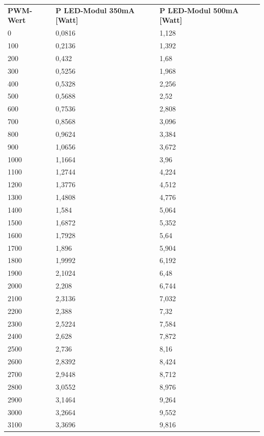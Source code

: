 \documentclass[a4paper,12pt]{scrartcl}
\begin{document}
\begin{longtable}[H]{p{35mm}>{\columncolor[gray]{0.97}}p{35mm}p{35mm}}
  \rowcolor[gray]{.9}
    \textbf{PWM-Wert} & \textbf{P LED-Modul 350mA [Watt]} & \textbf{P LED-Modul 500mA [Watt]} \\ 
0	&	0,0816	&	1,128	\\
\rowcolor[gray]{.95}
100	&	0,2136	&	1,392	\\
200	&	0,432	&	1,68	\\
\rowcolor[gray]{.95}
300	&	0,5256	&	1,968	\\
400	&	0,5328	&	2,256	\\
\rowcolor[gray]{.95}
500	&	0,5688	&	2,52	\\
600	&	0,7536	&	2,808	\\
\rowcolor[gray]{.95}
700	&	0,8568	&	3,096	\\
800	&	0,9624	&	3,384	\\
\rowcolor[gray]{.95}
900	&	1,0656	&	3,672	\\
1000	&	1,1664	&	3,96	\\
\rowcolor[gray]{.95}
1100	&	1,2744	&	4,224	\\
1200	&	1,3776	&	4,512	\\
\rowcolor[gray]{.95}
1300	&	1,4808	&	4,776	\\
1400	&	1,584	&	5,064	\\
\rowcolor[gray]{.95}
1500	&	1,6872	&	5,352	\\
1600	&	1,7928	&	5,64	\\
\rowcolor[gray]{.95}
1700	&	1,896	&	5,904	\\
1800	&	1,9992	&	6,192	\\
\rowcolor[gray]{.95}
1900	&	2,1024	&	6,48	\\
2000	&	2,208	&	6,744	\\
\rowcolor[gray]{.95}
2100	&	2,3136	&	7,032	\\
2200	&	2,388	&	7,32	\\
\rowcolor[gray]{.95}
2300	&	2,5224	&	7,584	\\
2400	&	2,628	&	7,872	\\
\rowcolor[gray]{.95}
2500	&	2,736	&	8,16	\\
2600	&	2,8392	&	8,424	\\
\rowcolor[gray]{.95}
2700	&	2,9448	&	8,712	\\
2800	&	3,0552	&	8,976	\\
\rowcolor[gray]{.95}
2900	&	3,1464	&	9,264	\\
3000	&	3,2664	&	9,552	\\
\rowcolor[gray]{.95}
3100	&	3,3696	&	9,816	\\

\end{longtable}
\end{document}
